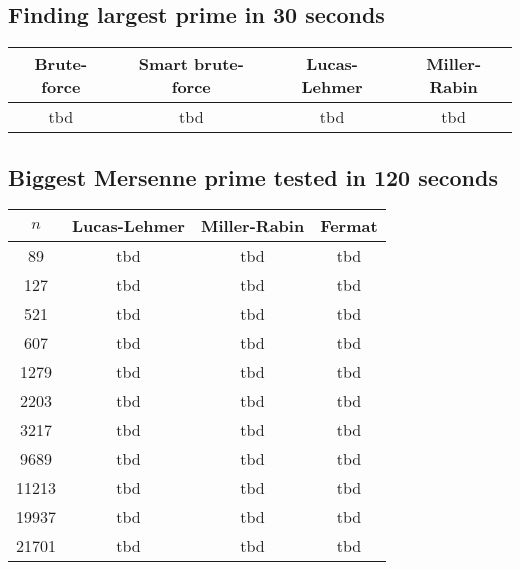 \documentclass[main.tex]{subfiles}
\begin{document}
\subsection{Finding largest prime in 30 seconds}

\begin{table}[ht!]
    \centering
    \begin{tabular}{||c c c c||} 
        \hline
        Brute-force & Smart brute-force & Lucas-Lehmer & Miller-Rabin \\ [0.5ex] 
        \hline\hline
        tbd & tbd & tbd & tbd\\   [1ex] 
        \hline
    \end{tabular}
\end{table}

\subsection{Biggest Mersenne prime tested in 120 seconds}

\begin{table}[ht!]
    \centering
    \begin{tabular}{||c c c c||} 
        \hline
        $n$ & Lucas-Lehmer & Miller-Rabin & Fermat \\ [0.5ex] 
        \hline\hline
        89 & tbd & tbd & tbd\\
        127 & tbd & tbd & tbd\\
        521 & tbd & tbd & tbd\\
        607 & tbd & tbd & tbd\\
        1279 & tbd & tbd & tbd\\
        2203 & tbd & tbd & tbd\\
        3217 & tbd & tbd & tbd\\
        9689 & tbd & tbd & tbd\\
        11213 & tbd & tbd & tbd\\
        19937 & tbd & tbd & tbd\\
        21701 & tbd & tbd & tbd\\  [1ex] 
        \hline
    \end{tabular}
\end{table}
\end{document}
